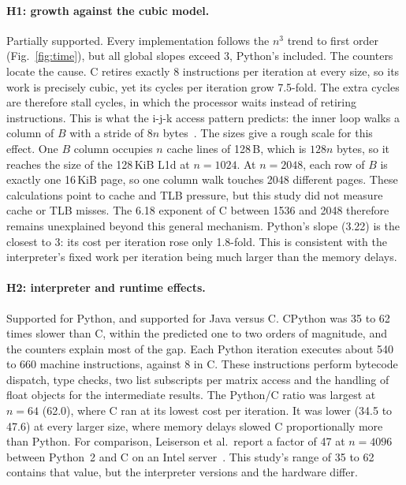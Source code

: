 \documentclass[11pt,a4paper]{article}
\begin{document}
\paragraph{H1: growth against the cubic model.} Partially supported. Every
implementation follows the $n^3$ trend to first order (Fig.~\ref{fig:time}), but
all global slopes exceed 3, Python's included. The counters locate the cause.
C retires exactly 8 instructions per iteration at every size, so its work is
precisely cubic, yet its cycles per iteration grow 7.5-fold. The extra cycles
are therefore stall cycles, in which the processor waits instead of retiring
instructions. This is what the i-j-k access
pattern predicts: the inner loop walks a column of $B$ with a stride of $8n$
bytes~\cite{bryant2016,drepper2007}. The sizes give a rough scale for this
effect. One $B$ column occupies $n$ cache lines of 128\,B, which is
$128n$ bytes, so it reaches the size of the 128\,KiB L1d at $n=1024$. At
$n=2048$, each row of $B$ is exactly one 16\,KiB page, so one column walk
touches 2048 different pages. These calculations point to cache and TLB pressure, but this
study did not measure cache or TLB misses. The 6.18 exponent of C between 1536
and 2048 therefore remains unexplained beyond this general mechanism. Python's
slope (3.22) is the closest to 3: its cost per iteration rose only 1.8-fold.
This is consistent with the interpreter's fixed work per iteration being much
larger than the memory delays.

\paragraph{H2: interpreter and runtime effects.} Supported for Python, and
supported for Java versus C. CPython was 35 to 62 times slower than C, within
the predicted one to two orders of magnitude, and the counters explain most of
the gap. Each Python iteration executes about 540 to 660 machine instructions,
against 8 in C. These instructions perform bytecode dispatch, type checks, two
list subscripts per matrix access and the handling of float objects for the
intermediate results. The Python/C ratio was largest at $n=64$ (62.0), where C
ran at its lowest cost per iteration. It was lower (34.5 to 47.6) at every larger
size, where memory delays slowed C proportionally more than Python. For comparison, Leiserson et al.\ report a factor of 47 at $n=4096$
between Python~2 and C on an Intel server~\cite{leiserson2020}. This study's
range of 35 to 62 contains that value, but the interpreter versions and the
hardware differ.
\end{document}
